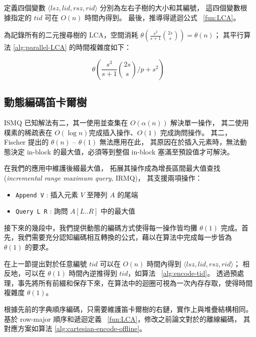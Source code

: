 定義四個變數 $\langle\mathit{lsz},\mathit{lid},\mathit{rsz},\mathit{rid}\rangle$ 分別為左右子樹的大小和其編號，
這四個變數根據指定的 $\mathit{tid}$ 可在 $O(n)$ 時間內得到。
最後，推導得遞迴公式 ~\ref{fun:LCA}。 



為記錄所有的二元搜尋樹的 LCA，空間消耗 $\theta\left(\frac{s^2}{s+1} \binom{2s}{s}\right) = \theta\left(n\right)$；
其平行算法 \ref{alg:parallel-LCA} 的時間複雜度如下：

\begin{equation}
\theta\left(\frac{s^3}{s+1} \binom{2s}{s} \bigg/ p + s^2 \right)
\end{equation}



\subsection{動態編碼笛卡爾樹}

ISMQ 已知解法有二，其一使用並查集在 $O(\alpha(n))$ 解決單一操作，
其二使用樸素的稀疏表在 $O(\log n)$完成插入操作、$O(1)$ 完成詢問操作。
其二，Fischer \cite{fischer} 提出的 $\theta(n)$ -- $\theta(1)$ 無法應用在此，
其原因在於插入元素時，無法動態決定 in-block 的最大值，必須等到整個 in-block 塞滿至預設值才可解決。

在我們的應用中維護後綴最大值，
拓展其操作成為增長區間最大值查找 (\emph{incremental range maximum query}, IRMQ)，
其支援兩項操作：

\begin{itemize}
  \item \texttt{Append V} : 插入元素 $V$ 至陣列 $A$ 的尾端
  \item \texttt{Query L R} : 詢問 $A[L .. R]$ 中的最大值
\end{itemize}


接下來的幾段中，我們提供動態的編碼方式使得每一操作皆均攤 $\theta(1)$ 完成。首先，我們需要充分認知編碼相互轉換的公式，藉以在算法中完成每一步皆為 $\theta(1)$ 的要求。

在上一節提出對於任意編號 $\mathit{tid}$ 可以在 $O(n)$ 時間內得到 $\langle\mathit{lsz},\mathit{lid},\mathit{rsz},\mathit{rid}\rangle$；
相反地，可以在 $\theta(1)$ 時間內逆推得到 $\mathit{tid}$，如算法 ~\ref{alg:encode-tid}。
透過預處理，事先將所有前綴和保存下來，在算法中的迴圈可視為一次內存存取，使得時間複雜度 $\theta(1)$。



根據先前的字典順序編碼，只需要維護笛卡爾樹的右鏈，實作上與堆疊結構相同。
基於 row-major 順序和遞迴定義 ~\ref{fun:LCA}，修改之前論文對於的離線編碼，
其對應方案如算法 \ref{alg:cartesian-encode-offline}。

